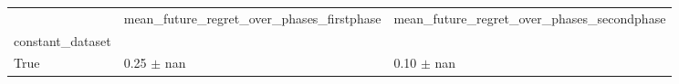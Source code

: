 \begin{tabular}{lll}
\toprule
 & mean_future_regret_over_phases_firstphase & mean_future_regret_over_phases_secondphase \\
constant_dataset &  &  \\
\midrule
True & 0.25 $\pm$ nan & 0.10 $\pm$ nan \\
\bottomrule
\end{tabular}
